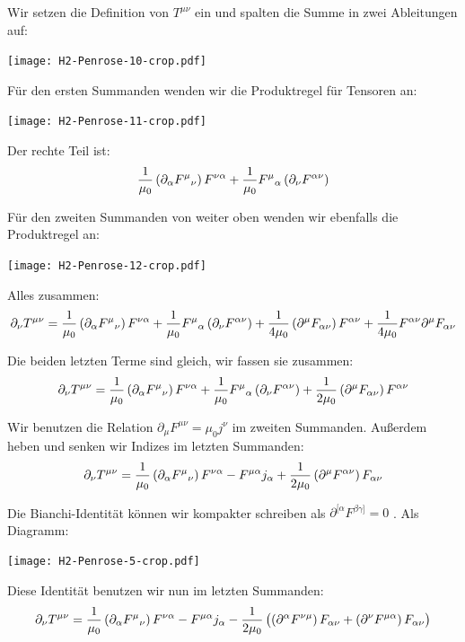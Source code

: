 Wir setzen die Definition von $T^{\mu\nu}$ ein und spalten die Summe in zwei
Ableitungen auf:
\begin{center}
	\texttt{[image: H2-Penrose-10-crop.pdf]}
\end{center}

Für den ersten Summanden wenden wir die Produktregel für Tensoren an:
\begin{center}
	\texttt{[image: H2-Penrose-11-crop.pdf]}
\end{center}

Der rechte Teil ist:
\[
	\frac1{\mu_0}
	\del{\partial_\alpha F^{\mu}{}_\nu} F^{\nu\alpha}
	+ \frac1{\mu_0}
	F^\mu{}_\alpha \del{\partial_\nu F^{\alpha\nu}}
\]

Für den zweiten Summanden von weiter oben wenden wir ebenfalls die Produktregel
an:
\begin{center}
	\texttt{[image: H2-Penrose-12-crop.pdf]}
\end{center}

Alles zusammen:
\[
	\partial_\nu T^{\mu\nu}
	=
	\frac1{\mu_0}
	\del{\partial_\alpha F^{\mu}{}_\nu} F^{\nu\alpha}
	+ \frac1{\mu_0}
	F^\mu{}_\alpha \del{\partial_\nu F^{\alpha\nu}}
	+ \frac1{4\mu_0}
	\del{\partial^\mu F_{\alpha\nu}} F^{\alpha\nu}
	+ \frac1{4\mu_0}
	F^{\alpha\nu} \partial^\mu F_{\alpha\nu}
\]

Die beiden letzten Terme sind gleich, wir fassen sie zusammen:
\[
	\partial_\nu T^{\mu\nu}
	=
	\frac1{\mu_0}
	\del{\partial_\alpha F^{\mu}{}_\nu} F^{\nu\alpha}
	+ \frac1{\mu_0}
	F^\mu{}_\alpha \del{\partial_\nu F^{\alpha\nu}}
	+ \frac1{2\mu_0}
	\del{\partial^\mu F_{\alpha\nu}} F^{\alpha\nu}
\]

Wir benutzen die Relation $\partial_\mu F^{\mu\nu} = \mu_0 j^\nu$ im zweiten
Summanden. Außerdem heben und senken wir Indizes im letzten Summanden:
\[
	\partial_\nu T^{\mu\nu}
	=
	\frac1{\mu_0}
	\del{\partial_\alpha F^{\mu}{}_\nu} F^{\nu\alpha}
	- F^{\mu\alpha} j_\alpha
	+ \frac1{2\mu_0}
	\del{\partial^\mu F^{\alpha\nu}} F_{\alpha\nu}
\]

Die Bianchi-Identität können wir kompakter schreiben als $\partial^{[\alpha}
F^{\beta\gamma]} = 0$ \cite[Seite 303]{penrose-road_to_reality}. Als Diagramm:
\begin{center}
	\texttt{[image: H2-Penrose-5-crop.pdf]}
\end{center}

Diese Identität benutzen wir nun im letzten Summanden:
\[
	\partial_\nu T^{\mu\nu}
	=
	\frac1{\mu_0}
	\del{\partial_\alpha F^{\mu}{}_\nu} F^{\nu\alpha}
	- F^{\mu\alpha} j_\alpha
	- \frac1{2\mu_0}
	\del{
		\del{\partial^\alpha F^{\nu\mu}} F_{\alpha\nu}
		+
		\del{\partial^\nu F^{\mu\alpha}} F_{\alpha\nu}
	}
\]

